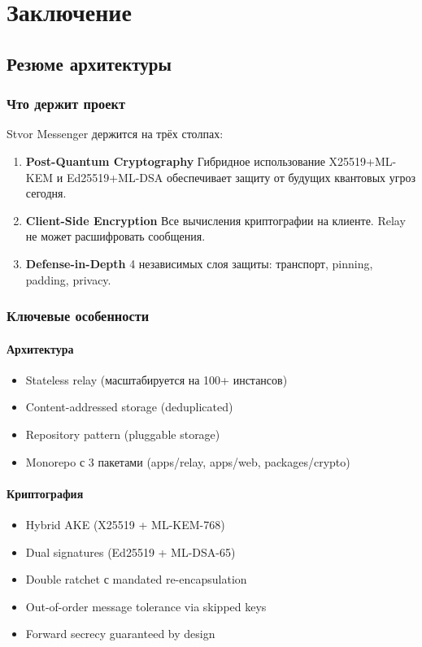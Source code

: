 \documentclass[11pt,a4paper,oneside]{book}
\begin{document}
\vspace{-1cm}\part{Заключение}
\vspace{-0.5cm}\chapter{Резюме архитектуры}
\vspace{-0.3cm}\section{Что держит проект}
Stvor Messenger держится на трёх столпах:
\begin{enumerate}
  \item \textbf{Post-Quantum Cryptography}
  Гибридное использование X25519+ML-KEM и Ed25519+ML-DSA обеспечивает защиту от будущих квантовых угроз сегодня.
  \item \textbf{Client-Side Encryption}
  Все вычисления криптографии на клиенте. Relay не может расшифровать сообщения.
  \item \textbf{Defense-in-Depth}
  4 независимых слоя защиты: транспорт, pinning, padding, privacy.
\end{enumerate}
\vspace{-0.3cm}\section{Ключевые особенности}
\vspace{-0.2cm}\subsection{Архитектура}
\begin{itemize}
  \item Stateless relay (масштабируется на 100+ инстансов)
  \item Content-addressed storage (deduplicated)
  \item Repository pattern (pluggable storage)
  \item Monorepo с 3 пакетами (apps/relay, apps/web, packages/crypto)
\end{itemize}
\vspace{-0.2cm}\subsection{Криптография}
\begin{itemize}
  \item Hybrid AKE (X25519 + ML-KEM-768)
  \item Dual signatures (Ed25519 + ML-DSA-65)
  \item Double ratchet с mandated re-encapsulation
  \item Out-of-order message tolerance via skipped keys
  \item Forward secrecy guaranteed by design
\end{itemize}
\end{document}
